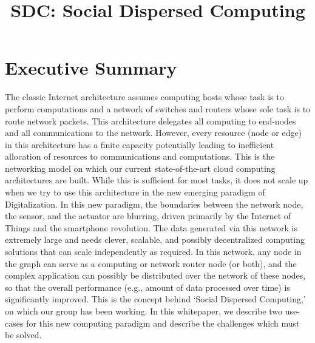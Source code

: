 \documentclass[12pt,letterpaper]{article}
\title{SDC: Social Dispersed Computing}
\date{}
\begin{document}
\maketitle

\section*{Executive Summary}

The classic Internet architecture assumes computing hosts whose task is to perform computations
and a network of switches and routers whose sole task is to route network packets. This architecture delegates all computing to end-nodes and all communications to the network. However, every resource (node or edge) in this architecture has a finite capacity potentially leading to inefficient allocation of resources to communications and computations.  This is the networking model on which our current state-of-the-art cloud computing architectures are built. While this is sufficient for most tasks, it does not scale up when we try to use this architecture in the new emerging paradigm of Digitalization. In this new paradigm, the boundaries between the network node, the sensor, and the actuator are blurring, driven primarily by the Internet of Things and the smartphone revolution. The data generated via this network is extremely large and needs clever, scalable, and possibly decentralized computing solutions that can scale independently as required. In this network, any node in the graph can serve as a computing or network
router node (or both), and  the complex application can possibly be distributed over the network
of these nodes, so that the overall performance (e.g., amount of data processed over
time) is significantly improved.  This is the concept behind `Social Dispersed Computing,' on which our group has been working. In this whitepaper, we describe two use-cases for this new computing paradigm and describe the challenges which must be solved.
\end{document}
